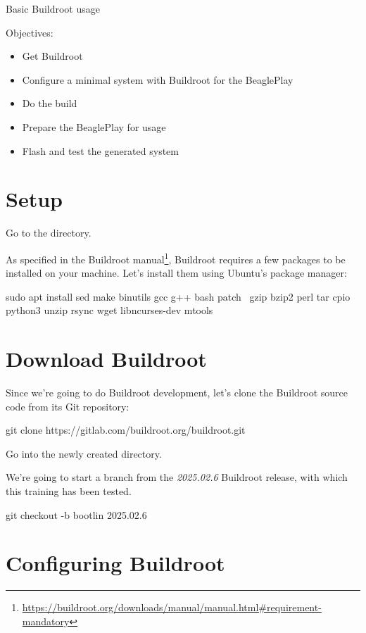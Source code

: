 \subchapter
{Basic Buildroot usage}
{Objectives:
  \begin{itemize}
  \item Get Buildroot
  \item Configure a minimal system with Buildroot for the BeaglePlay
  \item Do the build
  \item Prepare the BeaglePlay for usage
  \item Flash and test the generated system
  \end{itemize}
}

\section{Setup}

Go to the  directory.

As specified in the Buildroot
manual\footnote{\url{https://buildroot.org/downloads/manual/manual.html\#requirement-mandatory}},
Buildroot requires a few packages to be installed on your
machine. Let's install them using Ubuntu's package manager:

\begin{bashinput}
sudo apt install sed make binutils gcc g++ bash patch \
  gzip bzip2 perl tar cpio python3 unzip rsync wget libncurses-dev mtools
\end{bashinput}

\section{Download Buildroot}

Since we're going to do Buildroot development, let's clone the
Buildroot source code from its Git repository:

\begin{bashinput}
git clone https://gitlab.com/buildroot.org/buildroot.git
\end{bashinput}

Go into the newly created  directory.

We're going to start a branch from the {\em 2025.02.6} Buildroot
release, with which this training has been tested.

\begin{bashinput}
git checkout -b bootlin 2025.02.6
\end{bashinput}

\section{Configuring Buildroot}

